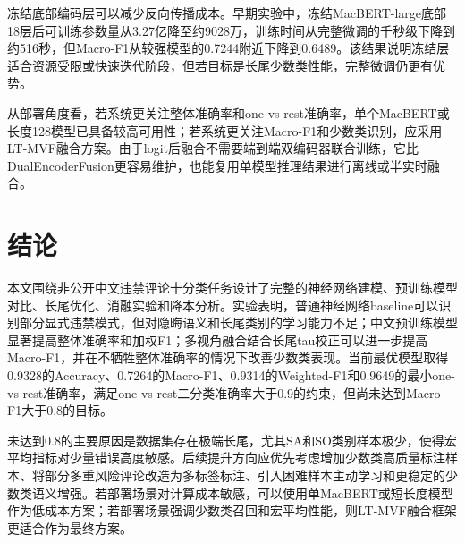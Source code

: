 \documentclass[UTF8, fontset=windows]{ctexart}
\begin{document}
	冻结底部编码层可以减少反向传播成本。早期实验中，冻结MacBERT-large底部18层后可训练参数量从3.27亿降至约9028万，训练时间从完整微调的千秒级下降到约516秒，但Macro-F1从较强模型的0.7244附近下降到0.6489。该结果说明冻结层适合资源受限或快速迭代阶段，但若目标是长尾少数类性能，完整微调仍更有优势。
	
	从部署角度看，若系统更关注整体准确率和one-vs-rest准确率，单个MacBERT或长度128模型已具备较高可用性；若系统更关注Macro-F1和少数类识别，应采用LT-MVF融合方案。由于logit后融合不需要端到端双编码器联合训练，它比DualEncoderFusion更容易维护，也能复用单模型推理结果进行离线或半实时融合。
	
	\newpage
	
	\section{结论}
	
	本文围绕非公开中文违禁评论十分类任务设计了完整的神经网络建模、预训练模型对比、长尾优化、消融实验和降本分析。实验表明，普通神经网络baseline可以识别部分显式违禁模式，但对隐晦语义和长尾类别的学习能力不足；中文预训练模型显著提高整体准确率和加权F1；多视角融合结合长尾tau校正可以进一步提高Macro-F1，并在不牺牲整体准确率的情况下改善少数类表现。当前最优模型取得0.9328的Accuracy、0.7264的Macro-F1、0.9314的Weighted-F1和0.9649的最小one-vs-rest准确率，满足one-vs-rest二分类准确率大于0.9的约束，但尚未达到Macro-F1大于0.8的目标。
	
	未达到0.8的主要原因是数据集存在极端长尾，尤其SA和SO类别样本极少，使得宏平均指标对少量错误高度敏感。后续提升方向应优先考虑增加少数类高质量标注样本、将部分多重风险评论改造为多标签标注、引入困难样本主动学习和更稳定的少数类语义增强。若部署场景对计算成本敏感，可以使用单MacBERT或短长度模型作为低成本方案；若部署场景强调少数类召回和宏平均性能，则LT-MVF融合框架更适合作为最终方案。
	
	\theendnotes
	
\end{document}

